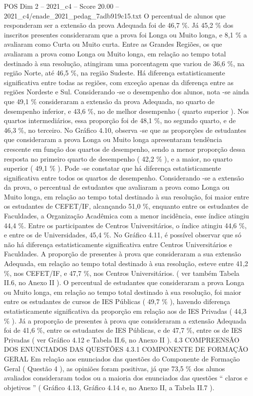 \begin{textsample}{POS Dim 2 – 2021\_c4 – Score 20.00 – 2021\_c4/enade\_2021\_pedag\_7adb919c15.txt}
O percentual de alunos que responderam ser a extensão da prova Adequada foi de 46,7 \%.
Já 45,2 \% dos inscritos presentes consideraram que a prova foi Longa ou Muito longa, e 8,1 \% a avaliaram como Curta ou Muito curta.
Entre as Grandes Regiões, os que avaliaram a prova como Longa ou Muito longa, em relação ao tempo total destinado à sua resolução, atingiram uma porcentagem que variou de 36,6 \%, na região Norte, até 46,5 \%, na região Sudeste.
Há diferença estatisticamente significativa entre todas as regiões, com exceção apenas da diferença entre as regiões Nordeste e Sul.
Considerando -se o desempenho dos alunos, nota -se ainda que 49,1 \% consideraram a extensão da prova Adequada, no quarto de desempenho inferior, e 43,6 \%, no de melhor desempenho ( quarto superior ).
Nos quartos intermediários, essa proporção foi de 48,1 \%, no segundo quarto, e de 46,3 \%, no terceiro.
No Gráfico 4.10, observa -se que as proporções de estudantes que consideraram a prova Longa ou Muito longa apresentaram tendência crescente em função dos quartos de desempenho, sendo a menor proporção dessa resposta no primeiro quarto de desempenho ( 42,2 \% ), e a maior, no quarto superior ( 49,1 \% ).
Pode -se constatar que há diferença estatisticamente significativa entre todos os quartos de desempenho.
Considerando -se a extensão da prova, o percentual de estudantes que avaliaram a prova como Longa ou Muito longa, em relação ao tempo total destinado à sua resolução, foi maior entre os estudantes de CEFET/IF, alcançando 51,0 \%, enquanto entre os estudantes de Faculdades, a Organização Acadêmica com a menor incidência, esse índice atingiu 44,4 \%.
Entre os participantes de Centros Universitários, o índice atingiu 44,6 \%, e entre os de Universidades, 45,4 \%.
No Gráfico 4.11, é possível observar que só não há diferença estatisticamente significativa entre Centros Universitários e Faculdades.
A proporção de presentes à prova que consideraram a sua extensão Adequada, em relação ao tempo total destinado à sua resolução, esteve entre 41,2 \%, nos CEFET/IF, e 47,7 \%, nos Centros Universitários. ( ver também Tabela II.6, no Anexo II ).
O percentual de estudantes que consideraram a prova Longa ou Muito longa, em relação ao tempo total destinado à sua resolução, foi maior entre os estudantes de cursos de IES Públicas ( 49,7 \% ), havendo diferença estatisticamente significativa da proporção em relação aos de IES Privadas ( 44,3 \% ).
Já a proporção de presentes à prova que consideraram a extensão Adequada foi de 41,6 \%, entre os estudantes de IES Públicas, e de 47,7 \%, entre os de IES Privadas ( ver Gráfico 4.12 e Tabela II.6, no Anexo II ). 4.3 COMPREENSÃO DOS ENUNCIADOS DAS QUESTÕES 4.3.1 COMPONENTE DE FORMAÇÃO GERAL Em relação aos enunciados das questões do Componente de Formação Geral ( Questão 4 ), as opiniões foram positivas, já que 73,5 \% dos alunos avaliados consideraram todos ou a maioria dos enunciados das questões “ claros e objetivos ” ( Gráfico 4.13, Gráfico 4.14 e, no Anexo II, a Tabela II.7 ).

\end{textsample}
